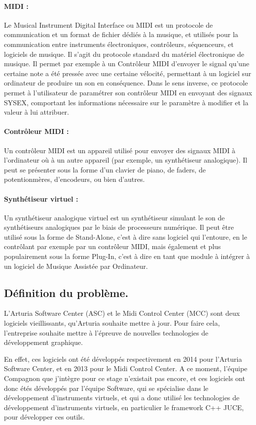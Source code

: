 \documentclass[francais]{rapportPFE}  %
\begin{document}
\paragraph{MIDI :} Le Musical Instrument Digital Interface ou MIDI est un protocole de communication et un format de fichier dédiés à la musique, et utilisés pour la communication entre instruments électroniques, contrôleurs, séquenceurs, et logiciels de musique. Il s'agit du protocole standard du matériel électronique de musique. Il permet par exemple à un Contrôleur MIDI d'envoyer le signal qu'une certaine note a été pressée avec une certaine vélocité, permettant à un logiciel sur ordinateur de produire un son en conséquence. Dans le sens inverse, ce protocole permet à l'utilisateur de paramétrer son contrôleur MIDI en envoyant des signaux SYSEX, comportant les informations nécessaire sur le paramètre à modifier et la valeur à lui attribuer.
\paragraph{Contrôleur MIDI :} Un contrôleur MIDI est un appareil utilisé pour envoyer des signaux MIDI à l'ordinateur où à un autre appareil (par exemple, un synthétiseur analogique). Il peut se présenter sous la forme d'un clavier de piano, de faders, de potentionmères, d'encodeurs, ou bien d'autres.
\paragraph{Synthétiseur virtuel :} Un synthétiseur analogique virtuel est un synthétiseur simulant le son de synthétiseurs analogiques par le biais de processeurs numérique. Il peut être utilisé sous la forme de Stand-Alone, c'est à dire sans logiciel qui l'entoure, en le contrôlant par exemple par un contrôleur MIDI, mais également et plus populairement sous la forme Plug-In, c'est à dire en tant que module à intégrer à un logiciel de Musique Assistée par Ordinateur.

\subsection{Définition du problème.}
L'Arturia Software Center (ASC) et le Midi Control Center (MCC) sont deux logiciels vieillissants, qu'Arturia souhaite mettre à jour. Pour faire cela, l'entreprise souhaite mettre à l'épreuve de nouvelles technologies de développement graphique.

En effet, ces logiciels ont été développés respectivement en 2014 pour l'Arturia Software Center, et en 2013 pour le Midi Control Center. A ce moment, l'équipe Compagnon que j'intègre pour ce stage n'existait pas encore, et ces logiciels ont donc étés développés par l'équipe Software, qui se spécialise dans le développement d'instruments virtuels, et qui a donc utilisé les technologies de développement d'instruments virtuels, en particulier le framework C++ JUCE, pour développer ces outils. 
\end{document}
